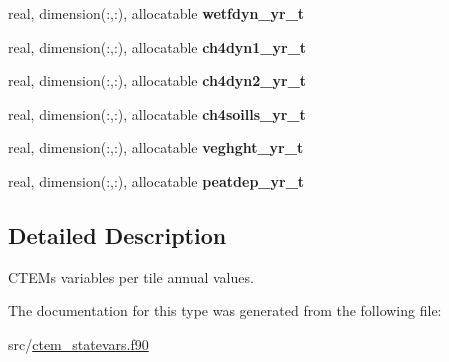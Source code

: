 \begin{DoxyCompactItemize}
\item 
\hypertarget{structctem__statevars_1_1ctem__tileavg__annual_a99ea0d9dc5559c31a28ccbde2fb77900}{}real, dimension(\+:,\+:), allocatable {\bfseries wetfdyn\+\_\+yr\+\_\+t}\label{structctem__statevars_1_1ctem__tileavg__annual_a99ea0d9dc5559c31a28ccbde2fb77900}

\item 
\hypertarget{structctem__statevars_1_1ctem__tileavg__annual_aa30c92d55297d52ad29e365c79720e8a}{}real, dimension(\+:,\+:), allocatable {\bfseries ch4dyn1\+\_\+yr\+\_\+t}\label{structctem__statevars_1_1ctem__tileavg__annual_aa30c92d55297d52ad29e365c79720e8a}

\item 
\hypertarget{structctem__statevars_1_1ctem__tileavg__annual_ada14403f7b829f779571fdcb2d9c44d7}{}real, dimension(\+:,\+:), allocatable {\bfseries ch4dyn2\+\_\+yr\+\_\+t}\label{structctem__statevars_1_1ctem__tileavg__annual_ada14403f7b829f779571fdcb2d9c44d7}

\item 
\hypertarget{structctem__statevars_1_1ctem__tileavg__annual_a88775db514ae33d096cd7eb9586f392c}{}real, dimension(\+:,\+:), allocatable {\bfseries ch4soills\+\_\+yr\+\_\+t}\label{structctem__statevars_1_1ctem__tileavg__annual_a88775db514ae33d096cd7eb9586f392c}

\item 
\hypertarget{structctem__statevars_1_1ctem__tileavg__annual_a6b4c9d39a92c68029096020d406809ab}{}real, dimension(\+:,\+:), allocatable {\bfseries veghght\+\_\+yr\+\_\+t}\label{structctem__statevars_1_1ctem__tileavg__annual_a6b4c9d39a92c68029096020d406809ab}

\item 
\hypertarget{structctem__statevars_1_1ctem__tileavg__annual_a90628ec866493683739946d69855e65d}{}real, dimension(\+:,\+:), allocatable {\bfseries peatdep\+\_\+yr\+\_\+t}\label{structctem__statevars_1_1ctem__tileavg__annual_a90628ec866493683739946d69855e65d}

\end{DoxyCompactItemize}


\subsection{Detailed Description}
C\+T\+E\+M\textquotesingle{}s variables per tile annual values. 

The documentation for this type was generated from the following file\+:\begin{DoxyCompactItemize}
\item 
src/\hyperlink{ctem__statevars_8f90}{ctem\+\_\+statevars.\+f90}\end{DoxyCompactItemize}

